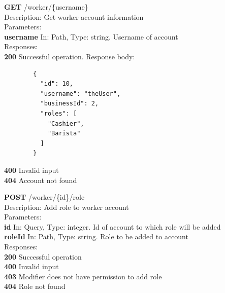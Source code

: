 \documentclass[11pt,a4paper,pdftex]{article}
\begin{document}
\hspace*{1em}\textbf{GET} /worker/\{username\}\\
\hspace*{2em}Description: Get worker account information\\
\hspace*{2em}Parameters:\\
\hspace*{3em}\textbf{username} In: Path, Type: string. Username of account\\
\hspace*{2em}Responses:\\
\hspace*{3em}\textbf{200} Successful operation. Response body:
\begin{verbatim}
        {
          "id": 10,
          "username": "theUser",
          "businessId": 2,
          "roles": [
            "Cashier",
            "Barista"
          ]
        }
\end{verbatim}
\hspace*{3em}\textbf{400} Invalid input\\
\hspace*{3em}\textbf{404} Account not found

\hspace*{1em}\textbf{POST} /worker/\{id\}/role\\
\hspace*{2em}Description: Add role to worker account\\
\hspace*{2em}Parameters:\\
\hspace*{3em}\textbf{id} In: Query, Type: integer. Id of account to which role will be added\\
\hspace*{3em}\textbf{roleId} In: Path, Type: string. Role to be added to account\\
\hspace*{2em}Responses:\\
\hspace*{3em}\textbf{200} Successful operation\\
\hspace*{3em}\textbf{400} Invalid input\\
\hspace*{3em}\textbf{403} Modifier does not have permission to add role\\
\hspace*{3em}\textbf{404} Role not found
\end{document}
